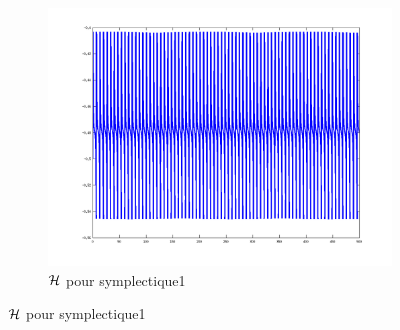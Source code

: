 \begin{figure}
\begin{subfigure}[b]{0.3\textwidth}
    \includegraphics[width=\textwidth]{images/Q1_symplectique1_H.png}
    \caption{$\mathcal{H}$ pour symplectique1}
    \label{fig:q1_symplectique1_H}
  \end{subfigure}


\end{figure}
